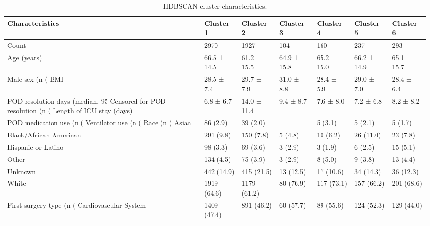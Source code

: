 \begin{table}

\caption{HDBSCAN cluster characteristics.}
\centering
\begin{tabular}[t]{lllllll}
\toprule
Characteristics & Cluster 1 & Cluster 2 & Cluster 3 & Cluster 4 & Cluster 5 & Cluster 6\\
\midrule
Count & 2970 & 1927 & 104 & 160 & 237 & 293\\
Age (years) & 66.5 ± 14.5 & 61.2 ± 15.5 & 64.9 ± 15.8 & 65.2 ± 15.0 & 66.2 ± 14.9 & 65.1 ± 15.7\\
Male sex (n (%
BMI & 28.5 ± 7.4 & 29.7 ± 7.9 & 31.0 ± 8.8 & 28.4 ± 5.9 & 29.0 ± 7.0 & 28.4 ± 6.4\\
POD resolution days (median, 95%
\addlinespace
Censored for POD resolution (n (%
Length of ICU stay (days) & 6.8 ± 6.7 & 14.0 ± 11.4 & 9.4 ± 8.7 & 7.6 ± 8.0 & 7.2 ± 6.8 & 8.2 ± 8.2\\
POD medication use (n (%
Ventilator use (n (%
Race (n (%
\addlinespace
Asian & 86 (2.9) & 39 (2.0) &  & 5 (3.1) & 5 (2.1) & 5 (1.7)\\
Black/African American & 291 (9.8) & 150 (7.8) & 5 (4.8) & 10 (6.2) & 26 (11.0) & 23 (7.8)\\
Hispanic or Latino & 98 (3.3) & 69 (3.6) & 3 (2.9) & 3 (1.9) & 6 (2.5) & 15 (5.1)\\
Other & 134 (4.5) & 75 (3.9) & 3 (2.9) & 8 (5.0) & 9 (3.8) & 13 (4.4)\\
Unknown & 442 (14.9) & 415 (21.5) & 13 (12.5) & 17 (10.6) & 34 (14.3) & 36 (12.3)\\
\addlinespace
White & 1919 (64.6) & 1179 (61.2) & 80 (76.9) & 117 (73.1) & 157 (66.2) & 201 (68.6)\\
First surgery type (n (%
Cardiovascular System & 1409 (47.4) & 891 (46.2) & 60 (57.7) & 89 (55.6) & 124 (52.3) & 129 (44.0)\\

\end{tabular}
\end{table}
